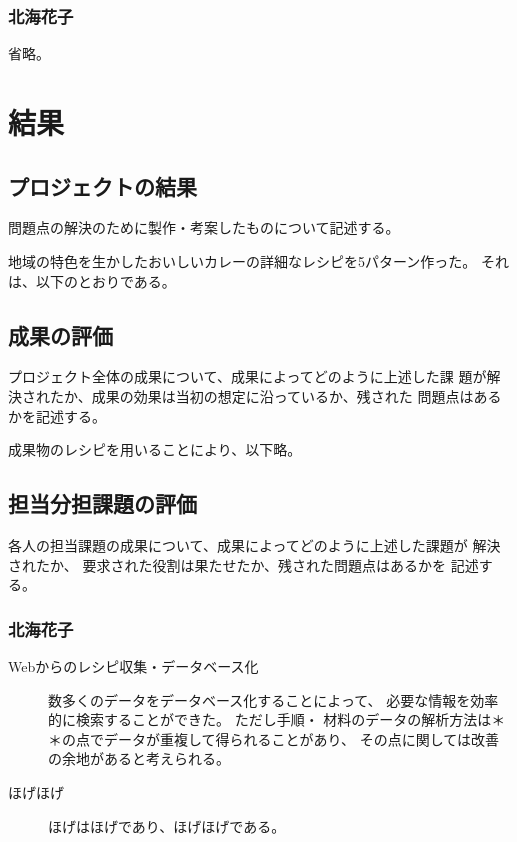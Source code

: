 \documentclass[openany,11pt,papersize]{jsbook}
\begin{document}
\subsection{北海花子}
省略。



\chapter{結果}

\section{プロジェクトの結果}
\begin{hissu}
問題点の解決のために製作・考案したものについて記述する。
\end{hissu}
地域の特色を生かしたおいしいカレーの詳細なレシピを5パターン作った。
それは、以下のとおりである。


\section{成果の評価}
\begin{hissu}
 プロジェクト全体の成果について、成果によってどのように上述した課
 題が解決されたか、成果の効果は当初の想定に沿っているか、残された
 問題点はあるかを記述する。
\end{hissu}

成果物のレシピを用いることにより、以下略。




\section{担当分担課題の評価}
\begin{hissu}
各人の担当課題の成果について、成果によってどのように上述した課題が
解決されたか、 要求された役割は果たせたか、残された問題点はあるかを
記述する。
\end{hissu}

\subsection{北海花子}
\begin{description}
 \item[Webからのレシピ収集・データベース化]
  数多くのデータをデータベース化することによって、
  必要な情報を効率的に検索することができた。 ただし手順・
  材料のデータの解析方法は＊＊の点でデータが重複して得られることがあり、
  その点に関しては改善の余地があると考えられる。
 \item[ほげほげ]
  ほげはほげであり、ほげほげである。
\end{description}
\end{document}
